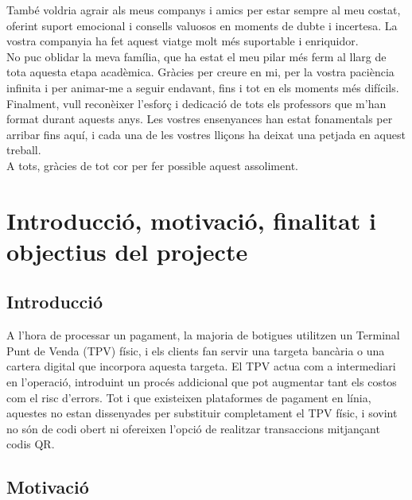 \documentclass[a4paper,12pt,twoside]{ThesisStyle}
\begin{document}
També voldria agrair als meus companys i amics per estar sempre al meu costat, oferint suport emocional i consells valuosos en moments de dubte i incertesa. La vostra companyia ha fet aquest viatge molt més suportable i enriquidor.\\

No puc oblidar la meva família, que ha estat el meu pilar més ferm al llarg de tota aquesta etapa acadèmica. Gràcies per creure en mi, per la vostra paciència infinita i per animar-me a seguir endavant, fins i tot en els moments més difícils.\\

Finalment, vull reconèixer l’esforç i dedicació de tots els professors que m’han format durant aquests anys. Les vostres ensenyances han estat fonamentals per arribar fins aquí, i cada una de les vostres lliçons ha deixat una petjada en aquest treball.\\

A tots, gràcies de tot cor per fer possible aquest assoliment.


\tableofcontents

\listoffigures

\listoftables

\mainmatter



\chapter{Introducció, motivació, finalitat i objectius del projecte}
\label{chp:intro}

\section{Introducció}
\label{sec:Introduccio}

A l'hora de processar un pagament, la majoria de botigues utilitzen un Terminal Punt de Venda (TPV) físic, i els clients fan servir una targeta bancària o una cartera digital que incorpora aquesta targeta. El TPV actua com a intermediari en l'operació, introduint un procés addicional que pot augmentar tant els costos com el risc d'errors. Tot i que existeixen plataformes de pagament en línia, aquestes no estan dissenyades per substituir completament el TPV físic, i sovint no són de codi obert ni ofereixen l'opció de realitzar transaccions mitjançant codis QR.

\section{Motivació}
\label{sec:Motivacio}
\end{document}

